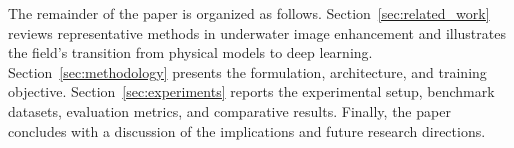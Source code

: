 The remainder of the paper is organized as follows. Section~\ref{sec:related_work} reviews representative methods in underwater image enhancement and illustrates the field's transition from physical models to deep learning. Section~\ref{sec:methodology} presents the formulation, architecture, and training objective. Section~\ref{sec:experiments} reports the experimental setup, benchmark datasets, evaluation metrics, and comparative results. Finally, the paper concludes with a discussion of the implications and future research directions.
